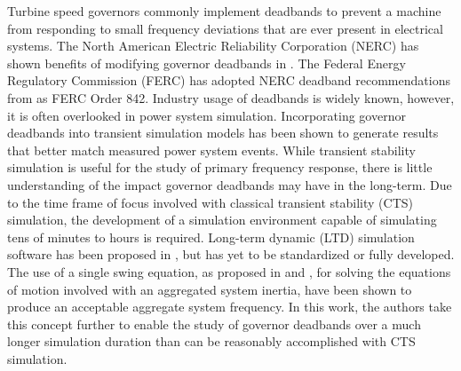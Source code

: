 %
%
Turbine speed governors commonly implement deadbands to prevent a machine from responding to small frequency deviations that are ever present in electrical systems.
The North American Electric Reliability Corporation (NERC) has shown benefits of modifying governor deadbands in \cite{nercFRI2012}.
The Federal Energy Regulatory Commission (FERC) has adopted NERC deadband recommendations from \cite{nercFRI2012} as FERC Order 842\cite{ferc2018}.
Industry usage of deadbands is widely known, however, it is often overlooked in power system simulation.
Incorporating governor deadbands into transient simulation models has been shown to generate results that better match measured power system events\cite{kou2016}.
While transient stability simulation is useful for the study of primary frequency response, there is little understanding of the impact governor deadbands may have in the long-term. 
Due to the time frame of focus involved with classical transient stability (CTS) simulation, the development of a simulation environment capable of simulating tens of minutes to hours is required. 
Long-term dynamic (LTD) simulation software has been proposed in \cite{AGCCresap, Stajcar, DonnellyVoltageControl}, but has yet to be standardized or fully developed.
The use of a single swing equation, as proposed in \cite{AGCCresap} and \cite{Stajcar}, for solving the equations of motion involved with an aggregated system inertia, have been shown to produce an acceptable aggregate system frequency. 
In this work, the authors take this concept further to enable the study of governor deadbands over a much longer simulation duration than can be reasonably accomplished with CTS simulation. 

